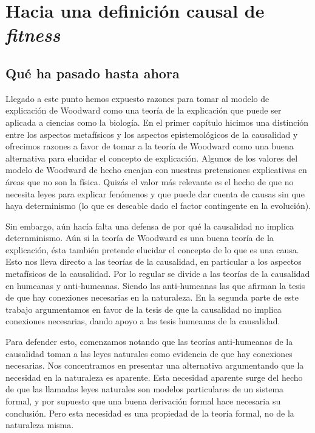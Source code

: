 
\chapter{Hacia una definición causal de \emph{fitness}}

\section{Qué ha pasado hasta ahora}

\noindent Llegado a este punto hemos expuesto razones para tomar al modelo de explicación de Woodward como una teoría de la explicación que puede ser aplicada a ciencias como la biología. En el primer capítulo hicimos una distinción entre los aspectos metafísicos y los aspectos epistemológicos de la causalidad y ofrecimos razones a favor de tomar a la teoría de Woodward como una buena alternativa para elucidar el concepto de explicación. Algunos de los valores del modelo de Woodward de hecho encajan con nuestras pretensiones explicativas en áreas que no son la física. Quizás el valor más relevante es el hecho de que no necesita leyes para explicar fenómenos y que puede dar cuenta de causas sin que haya determinismo (lo que es deseable dado el factor contingente en la evolución).

Sin embargo, aún hacía falta una defensa de por qué la causalidad no implica deternminismo. Aún si la teoría de Woodward es una buena teoría de la explicación, ésta también pretende elucidar el concepto de lo que es una causa. Esto nos lleva directo a las teorías de la causalidad, en particular a los aspectos metafísicos de la causalidad. Por lo regular se divide a las teorías de la causalidad en humeanas y anti-humeanas. Siendo las anti-humeanas las que afirman la tesis de que hay conexiones necesarias en la naturaleza. En la segunda parte de este trabajo argumentamos en favor de la tesis de que la causalidad no implica conexiones necesarias, dando apoyo a las tesis humeanas de la causalidad.

Para defender esto, comenzamos notando que las teorías anti-humeanas de la causalidad toman a las leyes naturales como evidencia de que hay conexiones necesarias. Nos concentramos en presentar una alternativa argumentando que la necesidad en la naturaleza es aparente. Esta necesidad aparente surge del hecho de que las llamadas leyes naturales son modelos particulares de un sistema formal, y por supuesto que una buena derivación formal hace necesaria su conclusión. Pero esta necesidad es una propiedad de la teoría formal, no de la naturaleza misma.

